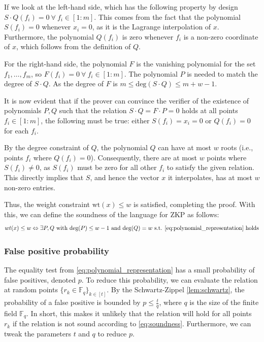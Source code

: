 \documentclass[11pt]{report}
\theoremstyle{definition}
\theoremstyle{plain}
\begin{document}
If we look at the left-hand side, which has the following property by design $S\cdot Q(f_i) = 0 \ \forall\ f_i \in [1:m]$. This comes from the fact that the polynomial $S(f_i) = 0$ whenever $x_i = 0$, as it is the Lagrange interpolation of $x$. Furthermore, the polynomial $Q(f_i)$ is zero whenever $f_i$ is a non-zero coordinate of $x$, which follows from the definition of $Q$.

For the right-hand side, the polynomial $F$ is the vanishing polynomial for the set ${f_1, \dots, f_m}$, so $F(f_i) = 0\ \forall\ f_i \in [1:m]$. The polynomial $P$ is needed to match the degree of $S \cdot Q$. As the degree of $F$ is $m \leq \text{deg}(S\cdot Q) \leq m + w - 1$.

It is now evident that if the prover can convince the verifier of the existence of polynomials $P, Q$ such that the relation $S \cdot Q = F \cdot P = 0$ holds at all points $f_i \in [1 : m]$, the following must be true: either $S(f_i) = x_i = 0$ or $Q(f_i) = 0$ for each $f_i$.

By the degree constraint of $Q$, the polynomial $Q$ can have at most $w$ roots (i.e., points $f_i$ where $Q(f_i) = 0$). Consequently, there are at most $w$ points where $S(f_i) \neq 0$, as $S(f_i)$ must be zero for all other $f_i$ to satisfy the given relation. This directly implies that $S$, and hence the vector $x$ it interpolates, has at most $w$ non-zero entries.

Thus, the weight constraint $\text{wt}(x) \leq w$ is satisfied, completing the proof. With this, we can define the soundness of the language for ZKP as follows:
\begin{equation}
  wt(x) \leq w \Leftrightarrow \exists P,Q \text{  with  }\text{deg}(P)\leq w-1\text{  and  }\text{deg}(Q) = w\text{ s.t. \autoref{eq:polynomial_representation} holds}\label{eq:soundness}
\end{equation}

\subsubsection{False positive probability}\label{sub:equality_test}
The equality test from \autoref{eq:polynomial_representation} has a small probability of false positives, denoted $p$. To reduce this probability, we can evaluate the relation at random points $\{r_k \in \mathbb{F}_q\}_{k\in[t]}$. By the Schwartz-Zippel \autoref{lem:schwartz}, the probability of a false positive is bounded by $p \leq \frac{t}{q}$, where $q$ is the size of the finite field $\mathbb{F}_q$. In short, this makes it unlikely that the relation will hold for all points $r_k$ if the relation is not sound according to \autoref{eq:soundness}. Furthermore, we can tweak the parameters $t$ and $q$ to reduce $p$.
\end{document}
